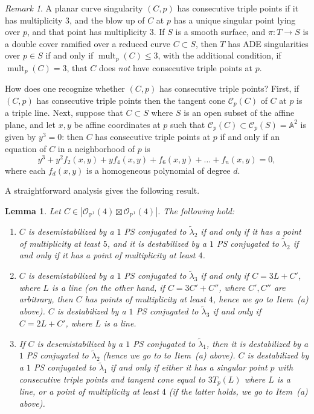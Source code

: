\documentclass[11pt]{amsart}
\numberwithin{equation}{section}
\theoremstyle{plain}
\newtheorem{lemma}[theorem]{Lemma}
\theoremstyle{remark}
\newtheorem{remark}[theorem]{Remark}
\theoremstyle{definition}
\newcommand\aff{{\mathbb A}}
\newcommand{\cC}{{\mathscr C}}
\newcommand{\cO}{{\mathscr O}}
\newcommand{\PP}{{\mathbb P}}
\newcommand{\wt}{\widetilde}
\DeclareMathOperator{\mult}{mult}
\begin{document}
\begin{remark}\label{rmk:constrip}
%
A planar curve singularity $(C,p)$ has consecutive triple points if it has multiplicity $3$, and the blow up of $C$ at $p$ has a unique singular point lying over $p$, and that point has multiplicity $3$.  If $S$ is a smooth surface, and $\pi\colon T\to S$ is a double cover ramified over a reduced curve $C\subset S$, then  $T$ has  ADE singularities over $p\in S$ if and only if   $\mult_p(C)\le 3$, with the additional condition, if $\mult_p(C)= 3$, that  $C$  does \emph{not} have  consecutive triple points at $p$. 

How does one recognize whether  $(C,p)$ has consecutive triple points? First, if $(C,p)$ has consecutive triple points then the tangent cone $\cC_p(C)$ of $C$ at $p$ is a triple line. Next,  suppose that $C\subset S$ where $S$ is an open subset of the affine plane, and let $x,y$ be affine coordinates at $p$ such that $\cC_p(C)\subset\cC_p(S)=\aff^2$ is  given by $y^3=0$: then $C$ has consecutive triple points at $p$ if and only if an  equation of $C$ in a neighborhood of $p$ is
%
\begin{equation}
%
y^3+y^2f_2(x,y)+yf_4(x,y)+f_6(x,y)+\ldots+ f_n(x,y)=0,
%
\end{equation}
%
where each $f_d(x,y)$ is a homogeneous polynomial of degree $d$. 
%
\end{remark}
%
A straightforward analysis gives the following result.
%
\begin{lemma}\label{lmm:git44}
%
Let $C\in | \cO_{\PP^1}(4)\boxtimes\cO_{\PP^1}(4)|$. The following hold:
%
\begin{enumerate}
%
\item[(a)]
%
$C$ is desemistabilized by a $1$ PS conjugated to $\wt{\lambda}_2$ if and only if it has a point of multiplicity at least $5$, and it is destabilized  by a $1$ PS conjugated to 
$\wt{\lambda}_2$ if and only if it has a point of multiplicity at least $4$.
%
\item[(b)]
%
$C$ is desemistabilized by a $1$ PS conjugated to $\wt{\lambda}_3$ if and only if $C=3L+C'$, where $L$ is a line (on the other hand, if $C=3C'+C''$, where $C',C''$ are arbitrary, then $C$ has points of multiplicity at least $4$, hence we go to Item~(a) above). $C$ is destabilized by a $1$ PS conjugated to $\wt{\lambda}_3$ if and only if 
$C=2L+C'$, where $L$ is a line.
%
\item[(c)]
%
If $C$ is desemistabilized by a $1$ PS conjugated to $\wt{\lambda}_1$, then it is   destabilized by a $1$ PS conjugated to $\wt{\lambda}_2$ (hence we go to to Item~(a) above). $C$ is destabilized by a $1$ PS conjugated to $\wt{\lambda}_1$ if and only if  either it has a singular point $p$ with consecutive triple points and tangent cone  equal to $3T_p(L)$ where $L$ is a line, or  a point of multiplicity at least $4$ (if the latter holds,   we go to Item~(a) above).
% 
\end{enumerate}
%
\end{lemma}
\end{document}
